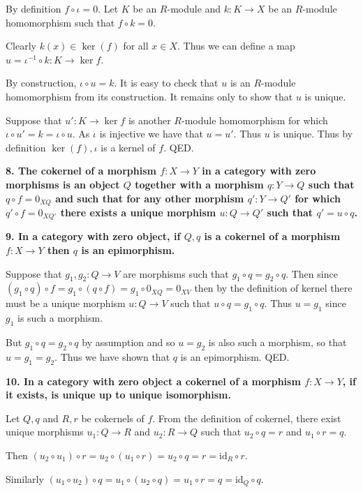 \documentclass[12pt]{article}
\begin{document}
By definition $f\circ \iota = 0$. Let $K$ be an $R$-module and $k : K \to X$ be an $R$-module homomorphism such that $f\circ k = 0$.

Clearly $k(x) \in \ker(f)$ for all $x \in X$. Thus we can define a map $u = \iota^{-1}\circ k : K \to \ker{f}$.

By construction, $\iota\circ u = k$. It is easy to check that $u$ is an $R$-module homomorphism from its construction. It remains only to show that $u$ is unique.

Suppose that $u' : K \to \ker{f}$ is another $R$-module homomorphism for which $\iota\circ u' = k = \iota\circ u$. As $\iota$ is injective we have that $u = u'$. Thus $u$ is unique. Thus by definition $\ker(f), \iota$ is a kernel of $f$. QED.

\textbf{8. The cokernel of a morphism $f : X \to Y$ in a category with zero morphisms is an object $Q$ together with a morphism $q : Y \to Q$ such that $q\circ f = 0_{XQ}$ and such that for any other morphism $q' : Y \to Q'$ for which $q'\circ f = 0_{XQ'}$ there exists a unique morphism $u : Q \to Q'$ such that $q' = u\circ q$.}

\textbf{9. In a category with zero object, if $Q, q$ is a cokernel of a morphism $f : X \to Y$ then $q$ is an epimorphism.}

Suppose that $g_1, g_2 : Q \to V$ are morphisms such that $g_1\circ q = g_2\circ q$. Then since $(g_1\circ q)\circ f = g_1\circ (q\circ f) = g_1\circ 0_{XQ} = 0_{XV}$ then by the definition of kernel there must be a unique morphism $u : Q \to V$ such that $u\circ q = g_1\circ q$. Thus $u = g_1$ since $g_1$ is such a morphism.

But $g_1\circ q = g_2\circ q$ by assumption and so $u = g_2$ is also such a morphism, so that $u = g_1 = g_2$. Thus we have shown that $q$ is an epimorphism. QED.

\textbf{10. In a category with zero object a cokernel of a morphism $f : X \to Y$, if it exists, is unique up to unique isomorphism.}

Let $Q, q$ and $R, r$ be cokernels of $f$. From the definition of cokernel, there exist unique morphisms $u_1 : Q \to R$ and $u_2 : R \to Q$ such that $u_2\circ q = r$ and $u_1\circ r = q$.

Then $(u_2\circ u_1)\circ r = u_2\circ (u_1\circ r) = u_2\circ q = r = \mbox{id}_R\circ r$.

Similarly $(u_1\circ u_2)\circ q = u_1\circ (u_2\circ q) = u_1\circ r = q = \mbox{id}_Q\circ q$.
\end{document}
